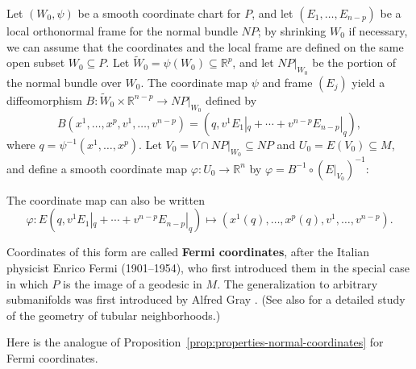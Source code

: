 Let $(W_0, \psi)$ be a smooth coordinate chart for $P$, and let $(E_1, \ldots, E_{n-p})$ be a local orthonormal frame for the normal bundle $NP$; by shrinking $W_0$ if necessary, we can assume that the coordinates and the local frame are defined on the same open subset $W_0 \subseteq P$. Let $\tilde{W}_0 = \psi(W_0) \subseteq \mathbb{R}^p$, and let $NP|_{W_0}$ be the portion of the normal bundle over $W_0$. The coordinate map $\psi$ and frame $(E_j)$ yield a diffeomorphism $B: \tilde{W}_0 \times \mathbb{R}^{n-p} \to NP|_{W_0}$ defined by
\[
B(x^1, \ldots, x^p, v^1, \ldots, v^{n-p}) = (q, v^1 E_1|_q + \cdots + v^{n-p} E_{n-p}|_q),
\]
where $q = \psi^{-1}(x^1, \ldots, x^p)$. Let $V_0 = V \cap NP|_{W_0} \subseteq NP$ and $U_0 = E(V_0) \subseteq M$, and define a smooth coordinate map $\varphi: U_0 \to \mathbb{R}^n$ by $\varphi = B^{-1} \circ (E|_{V_0})^{-1}$:


The coordinate map can also be written
\begin{equation}
\varphi: E\left(q, v^1 E_1|_q + \cdots + v^{n-p} E_{n-p}|_q\right) \mapsto \left(x^1(q), \ldots, x^p(q), v^1, \ldots, v^{n-p}\right). \tag{5.25}
\end{equation}

Coordinates of this form are called \textbf{Fermi coordinates}, after the Italian physicist Enrico Fermi (1901--1954), who first introduced them in the special case in which $P$ is the image of a geodesic in $M$. The generalization to arbitrary submanifolds was first introduced by Alfred Gray \cite{Gra82}. (See also \cite{Gra04} for a detailed study of the geometry of tubular neighborhoods.)

Here is the analogue of Proposition~\ref{prop:properties-normal-coordinates} for Fermi coordinates.

